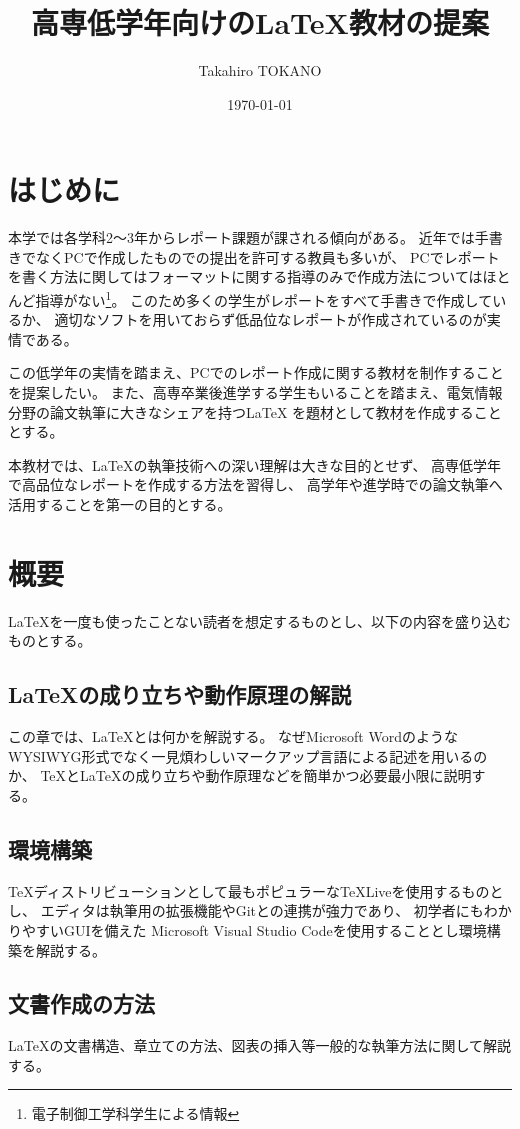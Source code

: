 \documentclass[uplatex]{jsarticle}
\title{高専低学年向けの\LaTeX 教材の提案}
\author{Takahiro TOKANO}
\date{\today}
\begin{document}
\maketitle

\section{はじめに}
	本学では各学科2～3年からレポート課題が課される傾向がある。
	近年では手書きでなくPCで作成したものでの提出を許可する教員も多いが、
	PCでレポートを書く方法に関してはフォーマットに関する指導のみで作成方法についてはほとんど指導がない\footnote{電子制御工学科学生による情報}。
	このため多くの学生がレポートをすべて手書きで作成しているか、
	適切なソフトを用いておらず低品位なレポートが作成されているのが実情である。

	この低学年の実情を踏まえ、PCでのレポート作成に関する教材を制作することを提案したい。
	また、高専卒業後進学する学生もいることを踏まえ、電気情報分野の論文執筆に大きなシェアを持つ\LaTeX
	を題材として教材を作成することとする。

	本教材では、\LaTeX の執筆技術への深い理解は大きな目的とせず、
	高専低学年で高品位なレポートを作成する方法を習得し、
	高学年や進学時での論文執筆へ活用することを第一の目的とする。

\section{概要}
	\LaTeX を一度も使ったことない読者を想定するものとし、以下の内容を盛り込むものとする。

	\subsection{\LaTeX の成り立ちや動作原理の解説}
		この章では、\LaTeX とは何かを解説する。
		なぜMicrosoft WordのようなWYSIWYG形式でなく一見煩わしいマークアップ言語による記述を用いるのか、
		\TeX と\LaTeX の成り立ちや動作原理などを簡単かつ必要最小限に説明する。

	\subsection{環境構築}
		\TeX ディストリビューションとして最もポピュラーな\TeX Liveを使用するものとし、
		エディタは執筆用の拡張機能やGitとの連携が強力であり、
		初学者にもわかりやすいGUIを備えた
		Microsoft Visual Studio Codeを使用することとし環境構築を解説する。

	\subsection{文書作成の方法}
		\LaTeX の文書構造、章立ての方法、図表の挿入等一般的な執筆方法に関して解説する。
\end{document}
